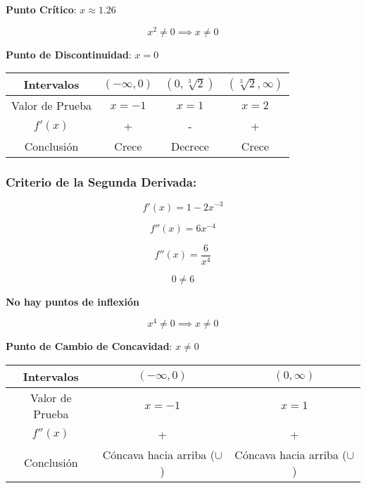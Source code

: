 \textbf{Punto Crítico}: \(x \approx 1.26\)

\[
x^2 \neq 0 \implies x \neq 0
\]

\textbf{Punto de Discontinuidad}: \(x = 0\)

\begin{center}
    \begin{tabular}{|c|c|c|c|}
        \hline
        Intervalos & $(-\infty,0)$ & $(0,\sqrt[3]{2})$ & $(\sqrt[3]{2},\infty)$ \\
        \hline
        Valor de Prueba & $x=-1$ & $x=1$ & $x=2$ \\
        \hline
        $f'(x)$ & + & - & + \\
        \hline
        Conclusión & Crece & Decrece & Crece \\
        \hline
    \end{tabular}
\end{center}

\subsubsection*{Criterio de la Segunda Derivada:}

\[
f'(x) = 1 - 2x^{-3}
\]

\[
f''(x) = 6x^{-4}
\]

\[
f''(x) = \frac{6}{x^4}
\]

\[
0 \neq 6
\]

\textbf{No hay puntos de inflexión}

\[
x^4 \neq 0 \implies x \neq 0
\]

\textbf{Punto de Cambio de Concavidad}: \(x \neq 0\)

\begin{center}
    \begin{tabular}{|c|c|c|}
        \hline
        Intervalos & $(-\infty,0)$ & $(0,\infty)$ \\
        \hline
        Valor de Prueba & $x=-1$ & $x=1$ \\
        \hline
        $f''(x)$ & + & + \\
        \hline
        Conclusión & Cóncava hacia arriba ($\cup$) & Cóncava hacia arriba ($\cup$) \\
        \hline
    \end{tabular}
\end{center}




